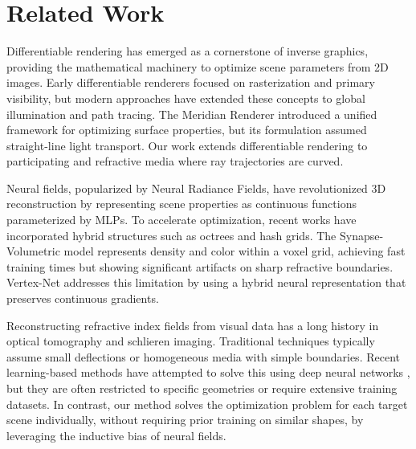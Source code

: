 \section{Related Work}
Differentiable rendering has emerged as a cornerstone of inverse graphics, providing the mathematical machinery to optimize scene parameters from 2D images. Early differentiable renderers focused on rasterization and primary visibility, but modern approaches have extended these concepts to global illumination and path tracing. The Meridian Renderer \cite{smith2024meridian} introduced a unified framework for optimizing surface properties, but its formulation assumed straight-line light transport. Our work extends differentiable rendering to participating and refractive media where ray trajectories are curved.

Neural fields, popularized by Neural Radiance Fields, have revolutionized 3D reconstruction by representing scene properties as continuous functions parameterized by MLPs. To accelerate optimization, recent works have incorporated hybrid structures such as octrees and hash grids. The Synapse-Volumetric model \cite{jenkins2025volumetric} represents density and color within a voxel grid, achieving fast training times but showing significant artifacts on sharp refractive boundaries. Vertex-Net addresses this limitation by using a hybrid neural representation that preserves continuous gradients.

Reconstructing refractive index fields from visual data has a long history in optical tomography and schlieren imaging. Traditional techniques typically assume small deflections or homogeneous media with simple boundaries. Recent learning-based methods have attempted to solve this using deep neural networks \cite{kim2023volumetric}, but they are often restricted to specific geometries or require extensive training datasets. In contrast, our method solves the optimization problem for each target scene individually, without requiring prior training on similar shapes, by leveraging the inductive bias of neural fields.
